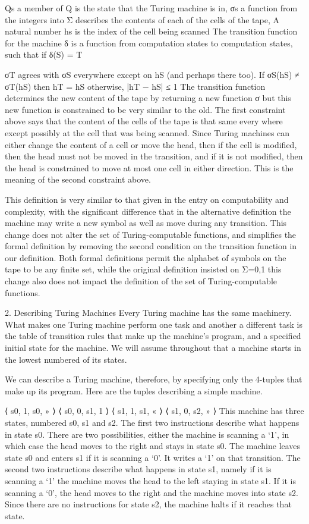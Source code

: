 Qs a member of Q is the state that the Turing machine is in,
σs a function from the integers into Σ describes the contents of each of the cells of the tape,
A natural number hs is the index of the cell being scanned
The transition function for the machine δ is a function from computation states to computation states, such that if δ(S) = T

σT agrees with σS everywhere except on hS (and perhaps there too).
If σS(hS) ≠ σT(hS) then hT = hS otherwise, |hT − hS| ≤ 1
The transition function determines the new content of the tape by returning a new function σ but this new function is constrained to be very similar to the old. The first constraint above says that the content of the cells of the tape is that same every where except possibly at the cell that was being scanned. Since Turing machines can either change the content of a cell or move the head, then if the cell is modified, then the head must not be moved in the transition, and if it is not modified, then the head is constrained to move at most one cell in either direction. This is the meaning of the second constraint above.

This definition is very similar to that given in the entry on computability and complexity, with the significant difference that in the alternative definition the machine may write a new symbol as well as move during any transition. This change does not alter the set of Turing-computable functions, and simplifies the formal definition by removing the second condition on the transition function in our definition. Both formal definitions permit the alphabet of symbols on the tape to be any finite set, while the original definition insisted on Σ={0,1} this change also does not impact the definition of the set of Turing-computable functions.

2. Describing Turing Machines
Every Turing machine has the same machinery. What makes one Turing machine perform one task and another a different task is the table of transition rules that make up the machine's program, and a specified initial state for the machine. We will assume throughout that a machine starts in the lowest numbered of its states.

We can describe a Turing machine, therefore, by specifying only the 4-tuples that make up its program. Here are the tuples describing a simple machine.

⟨ s0, 1, s0, » ⟩
⟨ s0, 0, s1, 1 ⟩
⟨ s1, 1, s1, « ⟩
⟨ s1, 0, s2, » ⟩
This machine has three states, numbered s0, s1 and s2. The first two instructions describe what happens in state s0. There are two possibilities, either the machine is scanning a ‘1’, in which case the head moves to the right and stays in state s0. The machine leaves state s0 and enters s1 if it is scanning a ‘0’. It writes a ‘1’ on that transition. The second two instructions describe what happens in state s1, namely if it is scanning a ‘1’ the machine moves the head to the left staying in state s1. If it is scanning a ‘0’, the head moves to the right and the machine moves into state s2. Since there are no instructions for state s2, the machine halts if it reaches that state.

